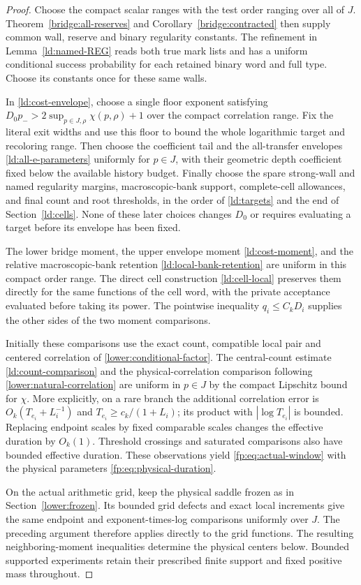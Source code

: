 \begin{proof}
Choose the compact scalar ranges with the test order ranging over
all of $J$. Theorem~\ref{bridge:all-reserves} and
Corollary~\ref{bridge:contracted} then supply common wall, reserve
and binary regularity constants. The refinement in
Lemma~\ref{ld:named-REG} reads both true mark lists and has a uniform
conditional success probability for each retained binary word and
full type. Choose its constants once for these same walls.

In \eqref{ld:cost-envelope}, choose a single floor exponent satisfying
$D_0p_->2\sup_{p\in J,\rho}\chi(p,\rho)+1$ over the compact
correlation range. Fix the literal exit widths and use this floor to
bound the whole logarithmic target and recoloring range. Then choose
the coefficient tail and the all-transfer envelopes
\eqref{ld:all-e-parameters} uniformly for $p\in J$, with their
geometric depth coefficient fixed below the available history budget.
Finally choose the spare strong-wall and named regularity margins,
macroscopic-bank support, complete-cell allowances, and final count
and root thresholds, in the order of \eqref{ld:targets} and the end
of Section~\ref{ld:cells}. None of these later choices changes $D_0$
or requires evaluating a target before its envelope has been fixed.

The lower bridge moment, the upper envelope moment
\eqref{ld:cost-moment}, and the relative macroscopic-bank retention
\eqref{ld:local-bank-retention} are uniform in this compact order
range. The direct cell construction \eqref{ld:cell-local} preserves
them directly for the same functions of the cell word, with the
private acceptance evaluated before taking its power. The pointwise inequality
$q_i\le C_kD_i$ supplies the other sides of the two moment
comparisons.

Initially these comparisons use the exact count, compatible local
pair and centered correlation of \eqref{lower:conditional-factor}.
The central-count estimate \eqref{ld:count-comparison} and the
physical-correlation comparison following
\eqref{lower:natural-correlation} are uniform in $p\in J$ by the
compact Lipschitz bound for $\chi$. More explicitly, on a rare
branch the additional correlation error is
$O_k(T_{e_i}+L_i^{-1})$ and
$T_{e_i}\ge c_k/(1+L_i)$; its product with $|\log T_{e_i}|$ is
bounded. Replacing endpoint scales by fixed comparable scales changes
the effective duration by $O_k(1)$. Threshold crossings and
saturated comparisons also have bounded effective duration.
These observations yield \eqref{fp:eq:actual-window} with the
physical parameters \eqref{fp:eq:physical-duration}.

On the actual arithmetic grid, keep the physical saddle frozen as
in Section~\ref{lower:frozen}. Its bounded grid defects and exact
local increments give the same endpoint and
exponent-times-log comparisons uniformly over $J$. The preceding
argument therefore applies directly to the grid functions. The
resulting neighboring-moment inequalities determine the physical
centers below. Bounded supported experiments retain their
prescribed finite support and fixed positive mass throughout.
\end{proof}

